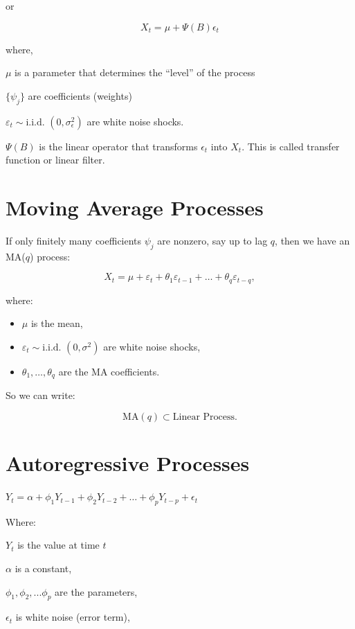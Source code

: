 \documentclass[
  11pt,
  a4paper,
]{report}
\begin{document}
or

\[X_t = \mu + \Psi(B)\epsilon_t\]

where,

\(\mu\) is a parameter that determines the ``level'' of the process

\(\{\psi_j\}\) are coefficients (weights)

\(\varepsilon_t \sim \text{i.i.d. } (0, \sigma^2_\epsilon)\) are white
noise shocks.

\(\Psi(B)\) is the linear operator that transforms \(\epsilon_t\) into
\(X_t\). This is called transfer function or linear filter.

\section{Moving Average Processes}\label{moving-average-processes}

If only finitely many coefficients \(\psi_j\) are nonzero, say up to lag
\(q\), then we have an MA(\(q\)) process:

\[X_t = \mu + \varepsilon_t + \theta_1 \varepsilon_{t-1} + \dots + \theta_q \varepsilon_{t-q},\]

where:

\begin{itemize}
\item
  \(\mu\) is the mean,
\item
  \(\varepsilon_t \sim \text{i.i.d. }(0, \sigma^2)\) are white noise
  shocks,
\item
  \(\theta_1, \dots, \theta_q\) are the MA coefficients.
\end{itemize}

So we can write:

\[\text{MA}(q) \subset \text{Linear Process}.\]

\section{Autoregressive Processes}\label{autoregressive-processes}

\(Y_t = \alpha + \phi_1 Y_{t-1} + \phi_2 Y_{t-2} + \dots + \phi_p Y_{t-p} + \epsilon_t\)

Where:

\(Y_t\) is the value at time \(t\)

\(\alpha\) is a constant,

\(\phi_1, \phi_2,...\phi_p\) are the parameters,

\(\epsilon_t\) is white noise (error term),
\end{document}
